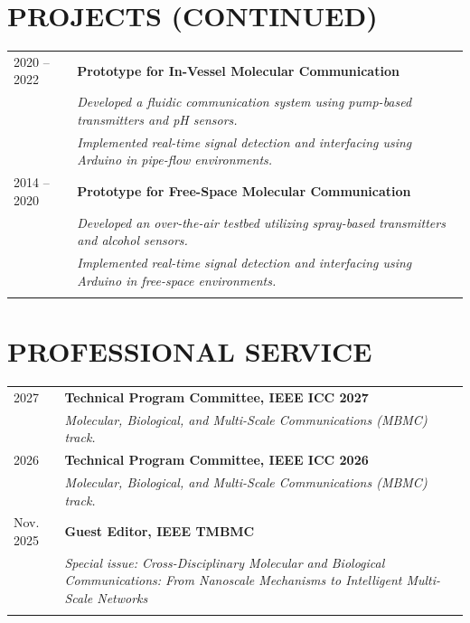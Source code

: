 \documentclass[a4paper,9pt]{extarticle}
\begin{document}
\newpage
\section*{PROJECTS (CONTINUED)}
\noindent
\begin{tabularx}{\textwidth}{@{} p{2cm} X @{}}
    2020 -- 2022 & \textbf{Prototype for In-Vessel Molecular Communication} \\
                &  \textit{Developed a fluidic communication system using pump-based transmitters and pH sensors.} \\
                &  \textit{Implemented real-time signal detection and interfacing using Arduino in pipe-flow environments.} \\ \addlinespace[0.5em]
                
    2014 -- 2020 & \textbf{Prototype for Free-Space Molecular Communication} \\
                &  \textit{Developed an over-the-air testbed utilizing spray-based transmitters and alcohol sensors.} \\
                &  \textit{Implemented real-time signal detection and interfacing using Arduino in free-space environments.} \\ \addlinespace[0.5em]
\end{tabularx}

\section*{PROFESSIONAL SERVICE}
\noindent
\begin{tabularx}{\textwidth}{@{} p{2cm} X @{}}
    2027 & \textbf{Technical Program Committee, IEEE ICC 2027} \\
         & \textit{Molecular, Biological, and Multi-Scale Communications (MBMC) track.} \\ \addlinespace[0.5em]

    2026 & \textbf{Technical Program Committee, IEEE ICC 2026} \\
         & \textit{Molecular, Biological, and Multi-Scale Communications (MBMC) track.} \\ \addlinespace[0.5em]

    Nov. 2025 & \textbf{Guest Editor, IEEE TMBMC} \\
              &  \textit{Special issue: Cross-Disciplinary Molecular and Biological Communications: From Nanoscale Mechanisms to Intelligent Multi-Scale Networks} \\ \addlinespace[0.5em]
    
\end{tabularx}
\end{document}
